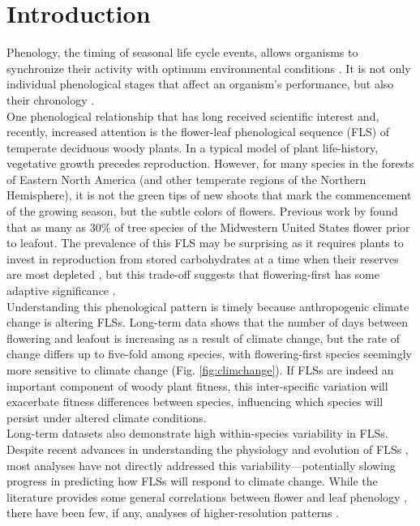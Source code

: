 \documentclass[11pt]{article}
\begin{document}
\section*{Introduction}
Phenology, the timing of seasonal life cycle events, allows organisms to synchronize their activity with optimum environmental conditions \citep{Forrest2010}. It is not only individual phenological stages that affect an organism's performance, but also their chronology \citep{Firmat2017,Vitasse2010,Ettinger2018}.\\

\noindent One phenological relationship that has long received scientific interest \citep[see][]{Robertson1895} and, recently, increased attention \citep[e.g.][]{Savage2019, Gougherty2018} is the flower-leaf phenological sequence (FLS) of temperate deciduous woody plants. In a typical model of plant life-history, vegetative growth precedes reproduction. However, for many species in the forests of Eastern North America (and other temperate regions of the Northern Hemisphere), it is not the green tips of new shoots that mark the commencement of the growing season, but the subtle colors of flowers. Previous work by \citet{Gougherty2018} found that as many as 30\% of tree species of the Midwestern United States flower prior to leafout. The prevalence of this FLS may be surprising as it requires plants to invest in reproduction from stored carbohydrates at a time when their reserves are most depleted \citep{Primack1987}, but this trade-off suggests that flowering-first has some adaptive significance \citep{Rathcke_1985}.\\

\noindent Understanding this phenological pattern is timely because anthropogenic climate change is altering FLSs. Long-term data shows that the number of days between flowering and leafout is increasing as a result of climate change, but the rate of change differs up to five-fold among species, with flowering-first species seemingly more sensitive  to climate change (Fig. \ref{fig:climchange}). If FLSs are indeed an important component of woody plant fitness, this inter-specific variation will exacerbate fitness differences between species, influencing which species will persist under altered climate conditions.\\ 

\noindent Long-term datasets also demonstrate high within-species variability in FLSs. Despite recent advances in understanding the physiology and evolution of FLSs \citep{Gougherty2018,Savage2019}, most analyses have not directly addressed this variability---potentially slowing progress in predicting how FLSs will respond to climate change. While the literature provides some general correlations between flower and leaf phenology \citep[e.g.][]{Lechowicz_1995, Ettinger2018}, there have been few, if any, analyses of higher-resolution patterns \citep{Gougherty2018}. \\
\end{document}
